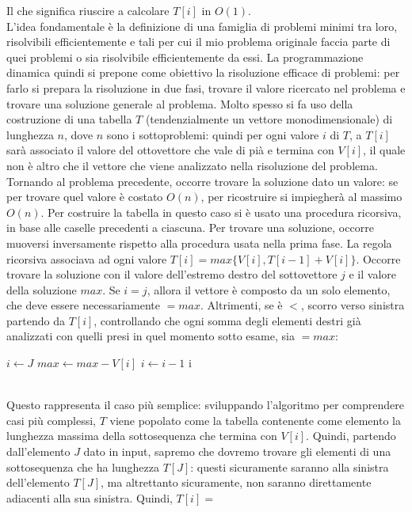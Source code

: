 Il che significa riuscire a calcolare $T[i]$ in $O(1)$. \\
L'idea fondamentale è la definizione di una famiglia di problemi minimi tra loro, risolvibili efficientemente e tali per cui il mio problema originale faccia parte di quei problemi o sia risolvibile efficientemente da essi.
La programmazione dinamica quindi si prepone come obiettivo la risoluzione efficace di problemi: per farlo si prepara la risoluzione in due fasi, trovare il valore ricercato nel problema e trovare una soluzione generale al problema. Molto spesso si fa uso della costruzione di una tabella $T$ (tendenzialmente un vettore monodimensionale) di lunghezza $n$, dove $n$ sono i sottoproblemi: quindi per ogni valore $i$ di $T$, a $T[i]$ sarà associato il valore del ottovettore che vale di pià e termina con $V[i]$, il quale non è altro che il vettore che viene analizzato nella risoluzione del problema. \\
Tornando al problema precedente, occorre trovare la soluzione dato un valore: se per trovare quel valore è costato $O(n)$, per ricostruire si impiegherà al massimo $O(n)$. Per costruire la tabella in questo caso si è usato una procedura ricorsiva, in base alle caselle precedenti a ciascuna. Per trovare una soluzione, occorre muoversi inversamente rispetto alla procedura usata nella prima fase. La regola ricorsiva associava ad ogni valore $T[i] = max\{V[i], T[i-1]+V[i]\}$. Occorre trovare la soluzione con il valore dell'estremo destro del sottovettore $j$ e il valore della soluzione $max$. Se $i=j$, allora il vettore è composto da un solo elemento, che deve essere necessariamente $=max$. Altrimenti, se è $<$, scorro verso sinistra partendo da $T[i]$, controllando che ogni somma degli elementi destri già analizzati con quelli presi in quel momento sotto esame, sia $=max$:
\begin{algorithm}
	\label{alg:subDIVpt2}
	\begin{algorithmic}
			\State $i \gets J$
				\State $max \gets max - V[i]$
				\State $i \gets i-1$
			\EndWhile
			\State \Return i
		\EndFunction
	\end{algorithmic}
\end{algorithm} \hfill \\
Questo rappresenta il caso più semplice: sviluppando l'algoritmo per comprendere casi più complessi, $T$ viene popolato come la tabella contenente come elemento la lunghezza massima della sottosequenza che termina con $V[i]$. Quindi, partendo dall'elemento $J$ dato in input, sapremo che dovremo trovare gli elementi di una sottosequenza che ha lunghezza $T[J]$: questi sicuramente saranno alla sinistra dell'elemento $T[J]$, ma altrettanto sicuramente, non saranno direttamente adiacenti alla sua sinistra. Quindi, $T[i] =$
